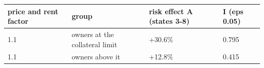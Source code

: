 \begingroup\small
\setlength{\tabcolsep}{3pt}
\renewcommand{\arraystretch}{1.04}
\begin{tabularx}{\linewidth}{XXXX}
\toprule
price and rent factor & group & risk effect A (states 3-8) & I (eps 0.05) \\
\midrule
1.1 & owners at the collateral limit & +30.6\% & 0.795 \\
1.1 & owners above it & +12.8\% & 0.415 \\
\bottomrule
\end{tabularx}
\endgroup

